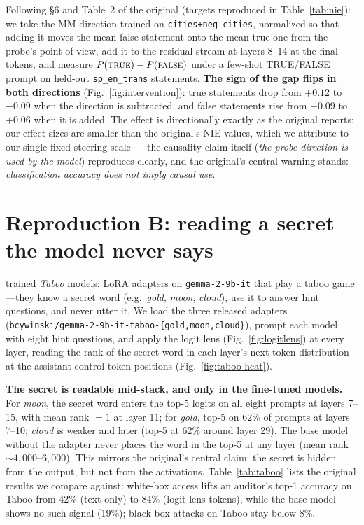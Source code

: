 \documentclass{article}
\begin{document}
Following \S6 and Table~2 of the original (targets reproduced in
Table~\ref{tab:nie}): we take the MM direction trained on
\texttt{cities+neg\_cities}, normalized so that adding it moves the mean false
statement onto the mean true one from the probe's point of view, add it to the
residual stream at layers 8--14 at the final tokens, and measure
$P(\textsc{true}) - P(\textsc{false})$ under a few-shot TRUE/FALSE prompt on
held-out \texttt{sp\_en\_trans} statements. \textbf{The sign of the gap flips
in both directions} (Fig.~\ref{fig:intervention}): true statements drop from
$+0.12$ to $-0.09$ when the direction is subtracted, and false statements rise
from $-0.09$ to $+0.06$ when it is added. The effect is directionally exactly
as the original reports; our effect sizes are smaller than the original's NIE
values, which we attribute to our single fixed steering scale --- the causality
claim itself (\emph{the probe direction is used by the model}) reproduces
clearly, and the original's central warning stands: \emph{classification
accuracy does not imply causal use}.

\section{Reproduction B: reading a secret the model never says}
\label{sec:taboo}

\citet{cywinski2025eliciting} trained \emph{Taboo} models: LoRA adapters on
\texttt{gemma-2-9b-it} \citep{gemma22024} that play a taboo game---they know a
secret word (e.g.\ \emph{gold}, \emph{moon}, \emph{cloud}), use it to answer
hint questions, and never utter it. We load the three released adapters
(\texttt{bcywinski/gemma-2-9b-it-taboo-\{gold,moon,cloud\}}), prompt each model
with eight hint questions, and apply the logit lens
(Fig.~\ref{fig:logitlens}) at every layer, reading the rank of the secret word
in each layer's next-token distribution at the assistant control-token
positions (Fig.~\ref{fig:taboo-heat}).

\textbf{The secret is readable mid-stack, and only in the fine-tuned models.}
For \emph{moon}, the secret word enters the top-5 logits on all eight prompts
at layers 7--15, with mean rank $=1$ at layer 11; for \emph{gold}, top-5 on
62\% of prompts at layers 7--10; \emph{cloud} is weaker and later (top-5 at
62\% around layer 29). The base model without the adapter never places the word
in the top-5 at any layer (mean rank $\sim 4{,}000$--$6{,}000$). This mirrors
the original's central claim: the secret is hidden from the output, but not
from the activations. Table~\ref{tab:taboo} lists the original results we
compare against: white-box access lifts an auditor's top-1 accuracy on Taboo
from 42\% (text only) to 84\% (logit-lens tokens), while the base model shows
no such signal (19\%); black-box attacks on Taboo stay below 8\%.
\end{document}
